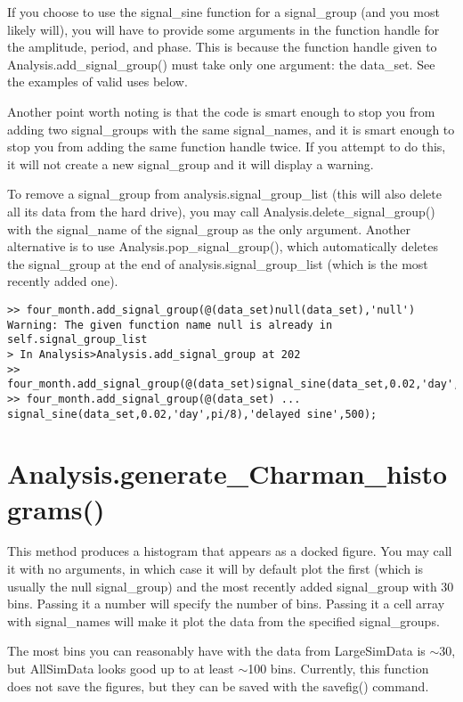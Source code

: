 \documentclass[12pt]{report}
\begin{document}
If you choose to use the signal\_sine function for a signal\_group (and you most likely will), you will have to provide some arguments in the function handle for the amplitude, period, and phase.  This is because the function handle given to Analysis.add\_signal\_group() must take only one argument: the data\_set.  See the examples of valid uses below.

Another point worth noting is that the code is smart enough to stop you from adding two signal\_groups with the same signal\_names, and it is smart enough to stop you from adding the same function handle twice.  If you attempt to do this, it will not create a new signal\_group and it will display a warning.

To remove a signal\_group from analysis.signal\_group\_list (this will also delete all its data from the hard drive), you may call Analysis.delete\_signal\_group() with the signal\_name of the signal\_group as the only argument.  Another alternative is to use Analysis.pop\_signal\_group(), which automatically deletes the signal\_group at the end of analysis.signal\_group\_list (which is the most recently added one).

\begin{verbatim}
>> four_month.add_signal_group(@(data_set)null(data_set),'null')
Warning: The given function name null is already in self.signal_group_list 
> In Analysis>Analysis.add_signal_group at 202 
>> four_month.add_signal_group(@(data_set)signal_sine(data_set,0.02,'day',0));
>> four_month.add_signal_group(@(data_set) ...
signal_sine(data_set,0.02,'day',pi/8),'delayed sine',500);
\end{verbatim}

\section{Analysis.generate\_Charman\_histograms()}
This method produces a histogram that appears as a docked figure.  You may call it with no arguments, in which case it will by default plot the first (which is usually the null signal\_group) and the most recently added signal\_group with 30 bins.  Passing it a number will specify the number of bins.  Passing it a cell array with signal\_names will make it plot the data from the specified signal\_groups.

The most bins you can reasonably have with the data from LargeSimData is ${\sim}$30, but AllSimData looks good up to at least ${\sim}$100 bins.  Currently, this function does not save the figures, but they can be saved with the savefig() command.
\end{document}
